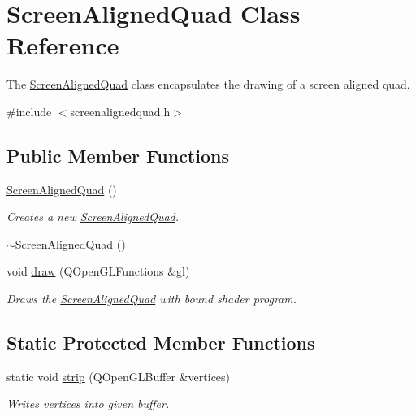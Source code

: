 \hypertarget{class_screen_aligned_quad}{}\section{Screen\+Aligned\+Quad Class Reference}
\label{class_screen_aligned_quad}


The \hyperlink{class_screen_aligned_quad}{Screen\+Aligned\+Quad} class encapsulates the drawing of a screen aligned quad.  




{\ttfamily \#include $<$screenalignedquad.\+h$>$}

\subsection*{Public Member Functions}
\begin{DoxyCompactItemize}
\item 
\hyperlink{class_screen_aligned_quad_a630c0116c0487eb2f20b16464bfaa3fb}{Screen\+Aligned\+Quad} ()
\begin{DoxyCompactList}\small\item\em Creates a new \hyperlink{class_screen_aligned_quad}{Screen\+Aligned\+Quad}. \end{DoxyCompactList}\item 
\hyperlink{class_screen_aligned_quad_a71ac9f1f3378bcaa1e4a379a7ea00bb8}{$\sim$\+Screen\+Aligned\+Quad} ()
\item 
void \hyperlink{class_screen_aligned_quad_ac288d2712b9846afb5077af53b454761}{draw} (Q\+Open\+G\+L\+Functions \&gl)
\begin{DoxyCompactList}\small\item\em Draws the \hyperlink{class_screen_aligned_quad}{Screen\+Aligned\+Quad} with bound shader program. \end{DoxyCompactList}\end{DoxyCompactItemize}
\subsection*{Static Protected Member Functions}
\begin{DoxyCompactItemize}
\item 
static void \hyperlink{class_screen_aligned_quad_a103c649c457d5fcaf90d3f8ed4b7e208}{strip} (Q\+Open\+G\+L\+Buffer \&vertices)
\begin{DoxyCompactList}\small\item\em Writes vertices into given buffer. \end{DoxyCompactList}\end{DoxyCompactItemize}


